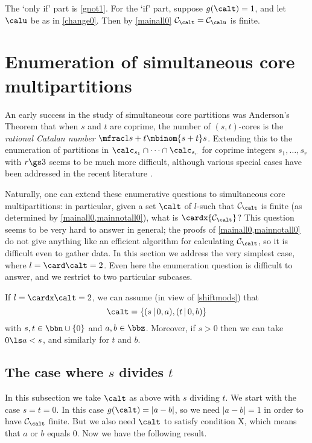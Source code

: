 \documentclass[a4paper, 11pt, twoside]{article}
\begin{document}
\begin{pf}
The `only if' part is \cref{gnot1}. For the `if' part, suppose $g(\calt)=1$, and let $\calu$ be as in \cref{change0}. Then by \cref{mainall0} $\smc\calt=\smc\calu$ is finite.
\end{pf}

\section{Enumeration of simultaneous core multipartitions}

An early success in the study of simultaneous core partitions was Anderson's Theorem \cite[Theorems 1 \& 3]{and} that when $s$ and $t$ are coprime, the number of $(s,t)$-cores is the \emph{rational Catalan number} $\mfrac1{s+t}\mbinom{s+t}s$. Extending this to the enumeration of partitions in $\cores{s_1}\cap\dots\cap\cores{s_r}$ for coprime integers $s_1,\dots,s_r$ with $r\gs3$ seems to be much more difficult, although various special cases have been addressed in the recent literature \cite{hana,amd,amle,wang,xiong}.

Naturally, one can extend these enumerative questions to simultaneous core multipartitions: in particular, given a set $\calt$ of $l$-\mcds such that $\smc\calt$ is finite (as determined by \cref{mainall0,mainnotall0}), what is $\cardx{\smc\calt}$? This question seems to be very hard to answer in general; the proofs of \cref{mainall0,mainnotall0} do not give anything like an efficient algorithm for calculating $\smc\calt$, so it is difficult even to gather data. In this section we address the very simplest case, where $l=\card\calt=2$. Even here the enumeration question is difficult to answer, and we restrict to two particular subcases.

If $l=\cardx\calt=2$, we can assume (in view of \cref{shiftmods}) that
\[
\calt=\{(s\,|\,0,a),(t\,|\,0,b)\}
\]
with $s,t\in\bbn\cup\{0\}$ and $a,b\in\bbz$. Moreover, if $s>0$ then we can take $0\ls a<s$, and similarly for $t$ and $b$.

\subsection{The case where $s$ divides $t$}\label{divsec}

In this subsection we take $\calt$ as above with $s$ dividing $t$. We start with the case $s=t=0$. In this case $g(\calt)=|a-b|$, so we need $|a-b|=1$ in order to have $\smc\calt$ finite. But we also need $\calt$ to satisfy condition X, which means that $a$ or $b$ equals $0$. Now we have the following result.
\end{document}
